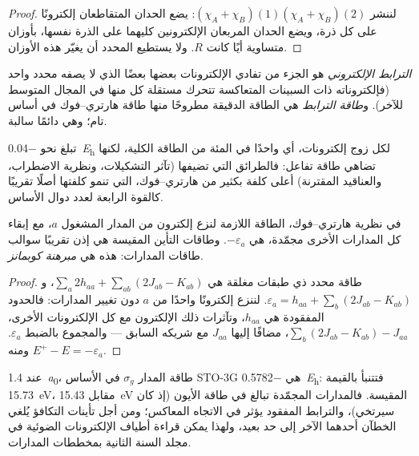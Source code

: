 \begin{proof}
لننشر $(\chi_A + \chi_B)(1)(\chi_A + \chi_B)(2)$: يضع الحدان المتقاطعان
إلكترونًا على كل ذرة، ويضع الحدان المربعان الإلكترونين كليهما على الذرة نفسها،
بأوزان متساوية أيًا كانت $R$. ولا يستطيع المحدد أن يغيّر هذه الأوزان.
\end{proof}

\begin{definition}\label{def:b3:computational-chemistry:correlation}
\emph{الترابط الإلكتروني} هو الجزء من
تفادي الإلكترونات بعضها بعضًا الذي لا يصفه محدد واحد (فإلكتروناته
ذات السبينات المتعاكسة تتحرك مستقلة كل منها في المجال المتوسط
للآخر). و\emph{طاقة الترابط} هي الطاقة
الدقيقة مطروحًا منها طاقة هارتري--فوك في أساس تام؛ وهي دائمًا
سالبة.
\end{definition}

تبلغ  نحو \qty{-0.04}{\hartree} لكل زوج إلكترونات، أي واحدًا
في المئة من الطاقة الكلية، لكنها تضاهي طاقة تفاعل:
فالطرائق التي تضيفها (تآثر التشكيلات، ونظرية الاضطراب،
والعناقيد المقترنة) أعلى كلفة بكثير من هارتري--فوك، التي تنمو كلفتها أصلًا
تقريبًا كالقوة الرابعة لعدد دوال الأساس.

\begin{theorem}\label{thm:b3:computational-chemistry:koopmans}
في نظرية هارتري--فوك، الطاقة اللازمة لنزع إلكترون من
المدار المشغول $a$، مع إبقاء كل المدارات الأخرى مجمّدة، هي $-\varepsilon_a$. 
وطاقات التأين المقيسة هي إذن تقريبًا سوالب
طاقات المدارات: هذه هي \emph{مبرهنة كوبمانز}.
\end{theorem}

\begin{proof}
طاقة محدد ذي طبقات مغلقة هي $\sum_a2h_{aa} + \sum_{ab}(2J_{ab} -
K_{ab})$، و$\varepsilon_a = h_{aa} + \sum_b(2J_{ab} - K_{ab})$. لننزع إلكترونًا واحدًا
من $a$ دون تغيير المدارات: فالحدود المفقودة هي $h_{aa}$، 
وتآثرات ذلك الإلكترون مع كل الإلكترونات الأخرى، $\sum_b(2J_{ab} - K_{ab}) -
J_{aa}$، مضافًا إليها $J_{aa}$ مع شريكه السابق --- والمجموع بالضبط
$\varepsilon_a$. ومنه $E^+ - E = -\varepsilon_a$.
\end{proof}

\begin{example}[تأيين \ce{H2}]\label{ex:b3:computational-chemistry:koopmans}
عند \qty{1.4}{\bohr}، طاقة المدار $\sigma_g$ في الأساس STO-3G هي
\qty{-0.5782}{\hartree}: فتتنبأ  بالقيمة \qty{15.73}{eV}، مقابل
\qty{15.43}{eV} المقيسة. فالمدارات المجمّدة تبالغ في طاقة الأيون (إذ
كان سيرتخي)، والترابط المفقود يؤثر في الاتجاه المعاكس؛ ومن أجل
تأينات التكافؤ يُلغي الخطآن أحدهما الآخر إلى حد بعيد، ولهذا يمكن قراءة أطياف
الإلكترونات الضوئية في مجلد السنة الثانية بمخططات المدارات.
\end{example}

